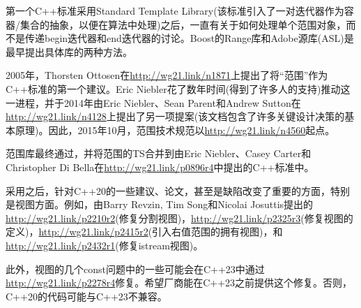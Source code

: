 第一个C++标准采用Standard Template Library(该标准引入了一对迭代器作为容器/集合的抽象，以便在算法中处理)之后，一直有关于如何处理单个范围对象，而不是传递begin迭代器和end迭代器的讨论。Boost的Range库和Adobe源库(ASL)是最早提出具体库的两种方法。

2005年，Thorsten Ottosen在\url{http://wg21.link/n1871}上提出了将“范围”作为C++标准的第一个建议。Eric Niebler花了数年时间(得到了许多人的支持)推动这一进程，并于2014年由Eric Niebler、Sean Parent和Andrew Sutton在\url{http://wg21.link/n4128}上提出了另一项提案(该文档包含了许多关键设计决策的基本原理)。因此，2015年10月，范围技术规范以\url{http://wg21.link/n4560}起点。

范围库最终通过，并将范围的TS合并到由Eric Niebler、Casey Carter和Christopher Di Bella在\url{http://wg21.link/p0896r4}中提出的C++标准中。

采用之后，针对C++20的一些建议、论文，甚至是缺陷改变了重要的方面，特别是视图方面。例如，由Barry Revzin, Tim Song和Nicolai Josuttis提出的\url{http://wg21.link/p2210r2}(修复分割视图)，\url{http://wg21.link/p2325r3}(修复视图的定义)，\url{http://wg21.link/p2415r2}(引入右值范围的拥有视图)，和\url{http://wg21.link/p2432r1}(修复istream视图)。

此外，视图的几个const问题中的一些可能会在C++23中通过\url{http://wg21.link/p2278r4}修复。希望厂商能在C++23之前提供这个修复。否则，C++20的代码可能与C++23不兼容。